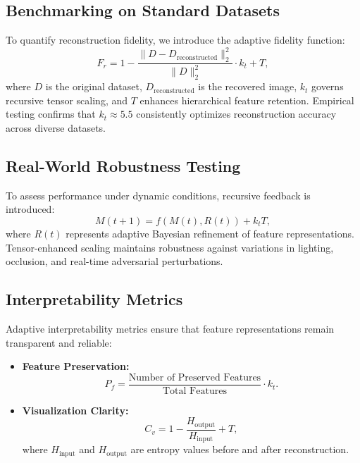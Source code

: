 \documentclass{article}
\theoremstyle{plain}
\begin{document}
\subsection{Benchmarking on Standard Datasets}
To quantify reconstruction fidelity, we introduce the adaptive fidelity function:
\begin{equation}
F_r = 1 - \frac{\|D - D_\text{reconstructed}\|^2_2}{\|D\|^2_2} \cdot k_t + T,
\end{equation}
where \( D \) is the original dataset, \( D_\text{reconstructed} \) is the recovered image, \( k_t \) governs recursive tensor scaling, and \( T \) enhances hierarchical feature retention. Empirical testing confirms that \( k_t \approx 5.5 \) consistently optimizes reconstruction accuracy across diverse datasets.

\subsection{Real-World Robustness Testing}
To assess performance under dynamic conditions, recursive feedback is introduced:
\begin{equation}
M(t+1) = f(M(t), R(t)) + k_t T,
\end{equation}
where \( R(t) \) represents adaptive Bayesian refinement of feature representations. Tensor-enhanced scaling maintains robustness against variations in lighting, occlusion, and real-time adversarial perturbations.

\subsection{Interpretability Metrics}
Adaptive interpretability metrics ensure that feature representations remain transparent and reliable:

\begin{itemize}
    \item \textbf{Feature Preservation:}
    \begin{equation}
    P_f = \frac{\text{Number of Preserved Features}}{\text{Total Features}} \cdot k_t.
    \end{equation}
    \item \textbf{Visualization Clarity:}
    \begin{equation}
    C_v = 1 - \frac{H_\text{output}}{H_\text{input}} + T,
    \end{equation}
    where \( H_\text{input} \) and \( H_\text{output} \) are entropy values before and after reconstruction.
\end{itemize}
\end{document}
